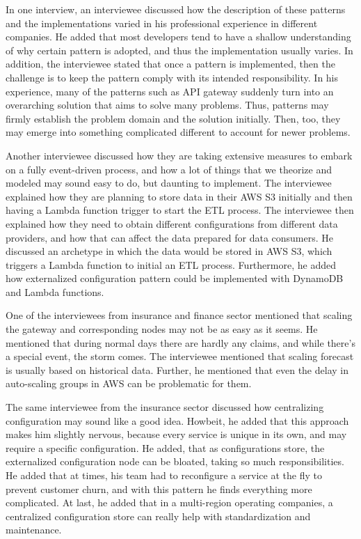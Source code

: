 \documentclass{bmcart}
\begin{document}
In one interview, an interviewee discussed how the description of these patterns and the implementations varied in his professional experience in different companies. He added that most developers tend to have a shallow understanding of why certain pattern is adopted, and thus the implementation usually varies. In addition, the interviewee stated that once a pattern is implemented, then the challenge is to keep the pattern comply with its intended responsibility. In his experience, many of the patterns such as API gateway suddenly turn into an overarching solution that aims to solve many problems. Thus, patterns may firmly establish the problem domain and the solution initially. Then, too, they may emerge into something complicated different to account for newer problems. 

Another interviewee discussed how they are taking extensive measures to embark on a fully event-driven process, and how a lot of things that we theorize and modeled may sound easy to do, but daunting to implement. The interviewee explained how they are planning to store data in their AWS S3 initially and then having a Lambda function trigger to start the ETL process. The interviewee then explained how they need to obtain different configurations from different data providers, and how that can affect the data prepared for data consumers. He discussed an archetype in which the data would be stored in AWS S3, which triggers a Lambda function to initial an ETL process. Furthermore, he added how externalized configuration pattern could be implemented with DynamoDB and Lambda functions.

One of the interviewees from insurance and finance sector mentioned that scaling the gateway and corresponding nodes may not be as easy as it seems. He mentioned that during normal days there are hardly any claims, and while there's a special event, the storm comes. The interviewee mentioned that scaling forecast is usually based on historical data. Further, he mentioned that even the delay in auto-scaling groups in AWS can be problematic for them. 

The same interviewee from the insurance sector discussed how centralizing configuration may sound like a good idea. Howbeit, he added that this approach makes him slightly nervous, because every service is unique in its own, and may require a specific configuration. He added, that as configurations store, the externalized configuration node can be bloated, taking so much responsibilities. He added that at times, his team had to reconfigure a service at the fly to prevent customer churn, and with this pattern he finds everything more complicated. At last, he added that in a multi-region operating companies, a centralized configuration store can really help with standardization and maintenance. 
\end{document}
